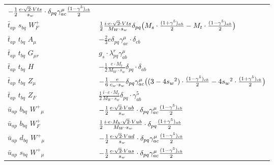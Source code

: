 \begin{center}
\begin{tabular}{|l|l|}
	$-\frac{1}{2}\frac{ e \cdot\sqrt{2} \cdot Vts}{ s_w}\cdot \delta_{p q} \gamma_{a c}^\mu {(1-\gamma^5)_{c b}\over 2} $\\[2mm]
$\bar{t}{}_{a p }$ \phantom{-} $s{}_{b q }$ \phantom{-} $W^+_F{}_{}$ \phantom{-}  &
	$\frac{1}{2}\frac{ i \cdot e \cdot\sqrt{2} \cdot Vts}{ M_W \cdot s_w}\delta_{p q} \big( M_s\cdot {(1+\gamma^5)_{a b}\over 2} - M_t\cdot {(1-\gamma^5)_{a b}\over 2} \big)$\\[2mm]
$\bar{t}{}_{a p }$ \phantom{-} $t{}_{b q }$ \phantom{-} ${A}_{\mu }$ \phantom{-}  &
	$-\frac{2}{3} e\delta_{p q} \gamma_{a c}^\mu \cdot \delta_{c b} $\\[2mm]
$\bar{t}{}_{a p }$ \phantom{-} $t{}_{b q }$ \phantom{-} ${G}_{\mu r }$ \phantom{-}  &
	$ g_s\cdot \lambda_{p q}^r \gamma_{a b}^\mu $\\[2mm]
$\bar{t}{}_{a p }$ \phantom{-} $t{}_{b q }$ \phantom{-} ${H}_{}$ \phantom{-}  &
	$-\frac{1}{2}\frac{ e \cdot M_t}{ M_W \cdot s_w}\delta_{p q} \cdot \delta_{a b} $\\[2mm]
$\bar{t}{}_{a p }$ \phantom{-} $t{}_{b q }$ \phantom{-} ${Z}_{\mu }$ \phantom{-}  &
	$-\frac{1}{6}\frac{ e}{ c_w \cdot s_w}\delta_{p q} \gamma_{a c}^\mu \big( (3-4 s_w {}^2)\cdot {(1-\gamma^5)_{c b}\over 2} -4 s_w{}^2 \cdot {(1+\gamma^5)_{c b}\over 2} \big)$\\[2mm]
$\bar{t}{}_{a p }$ \phantom{-} $t{}_{b q }$ \phantom{-} $Z_F{}_{}$ \phantom{-}  &
	$\frac{1}{2}\frac{ i \cdot e \cdot M_t}{ M_W \cdot s_w}\delta_{p q} \cdot \gamma_{a b}^5 $\\[2mm]
$\bar{u}{}_{a p }$ \phantom{-} $b{}_{b q }$ \phantom{-} $W^+{}_{\mu }$ \phantom{-}  &
	$-\frac{1}{2}\frac{ e \cdot\sqrt{2} \cdot Vub}{ s_w}\cdot \delta_{p q} \gamma_{a c}^\mu {(1-\gamma^5)_{c b}\over 2} $\\[2mm]
$\bar{u}{}_{a p }$ \phantom{-} $b{}_{b q }$ \phantom{-} $W^+_F{}_{}$ \phantom{-}  &
	$\frac{1}{2}\frac{ i \cdot e \cdot M_b \cdot\sqrt{2} \cdot Vub}{ M_W \cdot s_w}\cdot \delta_{p q} {(1+\gamma^5)_{a b}\over 2} $\\[2mm]
$\bar{u}{}_{a p }$ \phantom{-} $d{}_{b q }$ \phantom{-} $W^+{}_{\mu }$ \phantom{-}  &
	$-\frac{1}{2}\frac{ e \cdot\sqrt{2} \cdot Vud}{ s_w}\cdot \delta_{p q} \gamma_{a c}^\mu {(1-\gamma^5)_{c b}\over 2} $\\[2mm]
$\bar{u}{}_{a p }$ \phantom{-} $s{}_{b q }$ \phantom{-} $W^+{}_{\mu }$ \phantom{-}  &
	$-\frac{1}{2}\frac{ e \cdot\sqrt{2} \cdot Vus}{ s_w}\cdot \delta_{p q} \gamma_{a c}^\mu {(1-\gamma^5)_{c b}\over 2} $\\[2mm]

\end{tabular}
\end{center}
